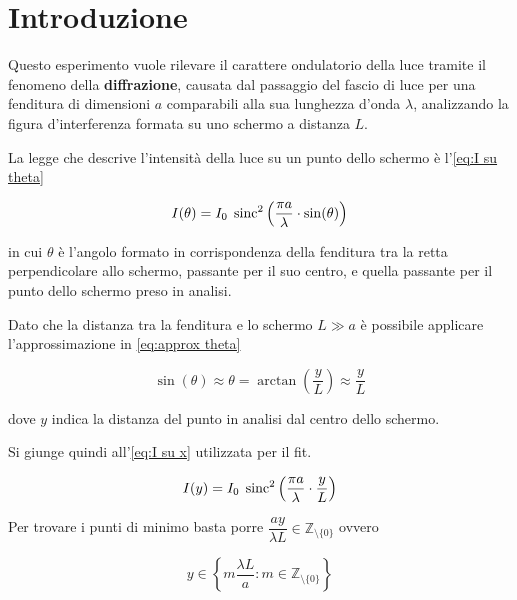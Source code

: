 \documentclass[../main.tex]{subfiles}
\begin{document}
\section{Introduzione}

Questo esperimento vuole rilevare il carattere ondulatorio della luce tramite il fenomeno della \textbf{diffrazione}, causata dal passaggio del fascio di luce per una fenditura di dimensioni $a$ comparabili alla sua lunghezza d'onda $\lambda$, analizzando la figura d'interferenza formata su uno schermo a distanza $L$.

La legge che descrive l'intensità della luce su un punto dello schermo è l'\autoref{eq:I su theta}

\begin{equation} \label{eq:I su theta}
    I(\theta) = I_{0} \; \operatorname{sinc}^{2} \left( \frac{\pi a}{\lambda} \cdot \sin(\theta)  \right)
\end{equation}

in cui $\theta$ è l'angolo formato in corrispondenza della fenditura tra la retta perpendicolare allo schermo, passante per il suo centro, e quella passante per il punto dello schermo preso in analisi.

Dato che la distanza tra la fenditura e lo schermo $L \gg a$ è possibile applicare l'approssimazione in \autoref{eq:approx theta}

\begin{equation} \label{eq:approx theta}
    \sin(\theta) \approx \theta = \arctan\left( \frac{y}{L} \right) \approx \frac{y}{L} 
\end{equation}

dove $y$ indica la distanza del punto in analisi dal centro dello schermo.

Si giunge quindi all'\autoref{eq:I su x} utilizzata per il fit.

\begin{equation} \label{eq:I su x}
    I(y) = I_{0} \; \operatorname{sinc}^{2} \left( \frac{\pi a}{\lambda} \cdot \frac{y}{L}  \right)
\end{equation}

Per trovare i punti di minimo basta porre $\dfrac{a y}{\lambda L} \in \mathbb{Z}_{\setminus \{0\}}$ ovvero

\begin{equation} \label{eq:y=0 values}
    y \in \left\{m\frac{\lambda L}{a}: m \in \mathbb{Z}_{\setminus \{0\}} \right\}
\end{equation}

\end{document}
